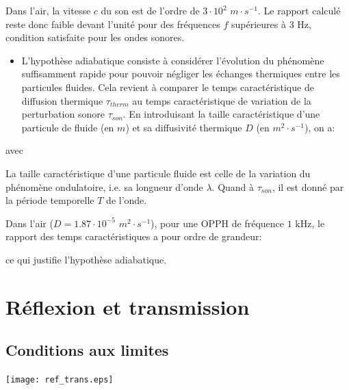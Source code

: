 \documentclass[a4paper, 12pt]{article}
\begin{document}
Dans l'air, la vitesse $c$ du son est de l'ordre de $3\cdot 10^{2}$ $m\cdot s^{-1}$. Le rapport calculé reste donc faible devant l'unité pour des fréquences $f$ supérieures à $3$ Hz, condition satisfaite pour les ondes sonores.

\begin{itemize}
\item L'hypothèse adiabatique consiste à considérer l'évolution du phénomène suffisamment rapide pour pouvoir négliger les échanges thermiques entre les particules fluides. Cela revient à comparer le temps caractéristique de diffusion thermique $\tau_{therm}$ au temps caractéristique de variation de la perturbation sonore $\tau_{son}$. En introduisant la taille caractéristique d'une particule de fluide (en $m$) et sa diffusivité thermique $D$ (en $m^{2}\cdot s^{-1}$), on a:
\end{itemize}
\begin{center}
 avec 
\end{center}

La taille caractéristique d'une particule fluide est celle de la variation du phénomène ondulatoire, i.e. sa longueur d'onde $\lambda$. Quand à $\tau_{son}$, il est donné par la période temporelle $T$ de l'onde.

Dans l'air ($D = 1.87\cdot 10^{-5}$ $m^{2}\cdot s^{-1}$), pour une OPPH de fréquence $1$ kHz, le rapport des temps caractéristiques a pour ordre de grandeur:
\begin{center}
\end{center}

ce qui justifie l'hypothèse adiabatique.

\newpage
\section{Réflexion et transmission}

\subsection{Conditions aux limites}

\begin{center}
 {\texttt{[image: ref\_trans.eps]}}
\end{center}
\end{document}
